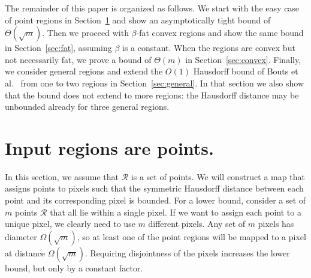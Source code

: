 \documentclass[a4paper,UKenglish,cleveref]{lipics-v2019}
\newcommand{\etal}{\textnormal{et al.}\xspace}
\begin{document}
The remainder of this paper is organized as follows. We start with the easy case of point regions in Section~\ref{sec:points} and show an asymptotically tight bound of $\Theta(\sqrt{m})$. Then we proceed with $\beta$-fat convex regions and show the same bound in
Section~\ref{sec:fat}, assuming $\beta$ is a constant. When the regions are convex but not necessarily fat, we prove a bound of $\Theta(m)$ in Section~\ref{sec:convex}. Finally, we consider general regions and extend the $O(1)$ Hausdorff bound of Bouts \etal~\cite{bouts2016mapping} from one to two regions
in Section~\ref{sec:general}. In that section we also show that the bound does not extend to more regions: the Hausdorff distance may be unbounded already for three general regions.





\section{Input regions are points.}
\label{sec:points}
In this section, we assume that $\mathcal{R}$ is a set of points. We will construct a map that assigns points to pixels such that the symmetric Hausdorff distance between each point and its corresponding pixel is bounded. 
For a lower bound, consider a set of $m$ points $\mathcal{R}$ that all lie within a single pixel. 
If we want to assign each point to a unique pixel, we clearly need to use $m$ different pixels. Any set of $m$ pixels has diameter $\Omega(\sqrt{m})$, so at least
one of the point regions will be mapped to a pixel at distance $\Omega(\sqrt{m})$. Requiring disjointness of the pixels increases the lower bound, but only by a constant factor.
\end{document}
